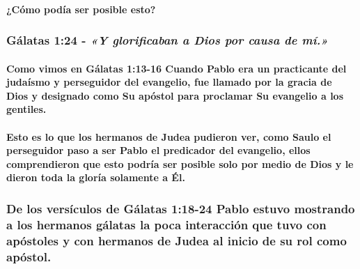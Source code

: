 \documentclass[11a pt,twoside]{article}
\newcommand{\scripture}[1]{%
  {\fontsize{12pt}{16pt}\selectfont\ScriptureFont\itshape #1}%
}
\let\oldsubsubsection\subsubsection
\renewcommand{\subsubsection}{\needspace{4\baselineskip}\oldsubsubsection}
\let\oldparagraph\paragraph
\renewcommand{\paragraph}{\needspace{3\baselineskip}\oldparagraph}
\begin{document}
\paragraph{¿Cómo podía ser posible
esto?}\label{cuxf3mo-poduxeda-ser-posible-esto}

\subsubsection{\texorpdfstring{Gálatas 1:24 -
\scripture{«Y glorificaban a Dios por causa de mí.»}}{Gálatas 1:24 - }}\label{guxe1latas-124---y-glorificaban-a-dios-por-causa-de-muxed.}

\paragraph{Como vimos en Gálatas 1:13-16 Cuando Pablo era un practicante
del judaísmo y perseguidor del evangelio, fue llamado por la gracia de
Dios y designado como Su apóstol para proclamar Su evangelio a los
gentiles.}\label{como-vimos-en-guxe1latas-113-16-cuando-pablo-era-un-practicante-del-judauxedsmo-y-perseguidor-del-evangelio-fue-llamado-por-la-gracia-de-dios-y-designado-como-su-apuxf3stol-para-proclamar-su-evangelio-a-los-gentiles.}

\paragraph{Esto es lo que los hermanos de Judea pudieron ver, como Saulo
el perseguidor paso a ser Pablo el predicador del evangelio, ellos
comprendieron que esto podría ser posible solo por medio de Dios y le
dieron toda la gloría solamente a
Él.}\label{esto-es-lo-que-los-hermanos-de-judea-pudieron-ver-como-saulo-el-perseguidor-paso-a-ser-pablo-el-predicador-del-evangelio-ellos-comprendieron-que-esto-podruxeda-ser-posible-solo-por-medio-de-dios-y-le-dieron-toda-la-gloruxeda-solamente-a-uxe9l.}

\subsubsection{De los versículos de Gálatas 1:18-24 Pablo estuvo
mostrando a los hermanos gálatas la poca interacción que tuvo con
apóstoles y con hermanos de Judea al inicio de su rol como
apóstol.}\label{de-los-versuxedculos-de-guxe1latas-118-24-pablo-estuvo-mostrando-a-los-hermanos-guxe1latas-la-poca-interacciuxf3n-que-tuvo-con-apuxf3stoles-y-con-hermanos-de-judea-al-inicio-de-su-rol-como-apuxf3stol.}
\end{document}
